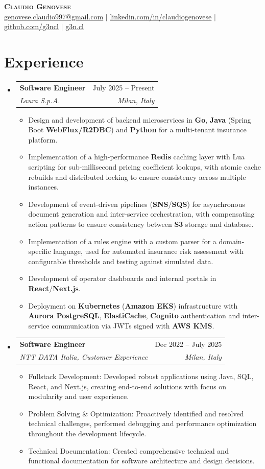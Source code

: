 \documentclass[letterpaper,11pt]{article}
\makeatletter
\newcommand{\resumeItem}[1]{
	\item\small{
		{#1 \vspace{-2pt}}
	}
}
\newcommand{\resumeSubheading}[4]{
	\vspace{-2pt}\item
	\begin{tabular*}{0.97\textwidth}[t]{l@{\extracolsep{\fill}}r}
		\textbf{#1} & #2 \\
		\textit{\small#3} & \textit{\small #4} \\
	\end{tabular*}\vspace{-7pt}
}
\newcommand{\resumeSubHeadingListStart}{\begin{itemize}[leftmargin=0.15in, label={}]}
\newcommand{\resumeSubHeadingListEnd}{\end{itemize}}
\newcommand{\resumeItemListStart}{\begin{itemize}}
\newcommand{\resumeItemListEnd}{\end{itemize}\vspace{-5pt}}
\makeatother
\begin{document}
	\begin{center}
		\textbf{\Huge \scshape Claudio Genovese} \\ \vspace{12pt}
		\href{mailto:genovese.claudio997@gmail.com}{\underline{genovese.claudio997@gmail.com}} $|$
		\href{https://linkedin.com/in/claudiogenovese}{\underline{linkedin.com/in/claudiogenovese}} $|$
		\href{https://github.com/g3ncl}{\underline{github.com/g3ncl}} $|$
		\href{https://g3n.cl}{\underline{g3n.cl}}
	\end{center}
	\section{Experience}
	\resumeSubHeadingListStart
	\resumeSubheading
	{Software Engineer}{July 2025 -- Present}
	{Laura S.p.A.}{Milan, Italy}
	\resumeItemListStart
	\resumeItem{Design and development of backend microservices in \textbf{Go}, \textbf{Java} (Spring Boot \textbf{WebFlux/R2DBC}) and \textbf{Python} for a multi-tenant insurance platform.}
	\resumeItem{Implementation of a high-performance \textbf{Redis} caching layer with Lua scripting for sub-millisecond pricing coefficient lookups, with atomic cache rebuilds and distributed locking to ensure consistency across multiple instances.}
	\resumeItem{Development of event-driven pipelines (\textbf{SNS}/\textbf{SQS}) for asynchronous document generation and inter-service orchestration, with compensating action patterns to ensure consistency between \textbf{S3} storage and database.}
	\resumeItem{Implementation of a rules engine with a custom parser for a domain-specific language, used for automated insurance risk assessment with configurable thresholds and testing against simulated data.}
	\resumeItem{Development of operator dashboards and internal portals in \textbf{React}/\textbf{Next.js}.}
	\resumeItem{Deployment on \textbf{Kubernetes} (\textbf{Amazon EKS}) infrastructure with \textbf{Aurora PostgreSQL}, \textbf{ElastiCache}, \textbf{Cognito} authentication and inter-service communication via JWTs signed with \textbf{AWS KMS}.}
	\resumeItemListEnd
	\resumeSubheading
	{Software Engineer}{Dec 2022 -- July 2025}
	{NTT DATA Italia, Customer Experience}{Milan, Italy}
	\resumeItemListStart
	\resumeItem{Fullstack Development: Developed robust applications using Java, SQL, React, and Next.js, creating end-to-end solutions with focus on modularity and user experience.}
	\resumeItem{Problem Solving \& Optimization: Proactively identified and resolved technical challenges, performed debugging and performance optimization throughout the development lifecycle.}
	\resumeItem{Technical Documentation: Created comprehensive technical and functional documentation for software architecture and design decisions.}
	\resumeItemListEnd
	\resumeSubHeadingListEnd
\end{document}
